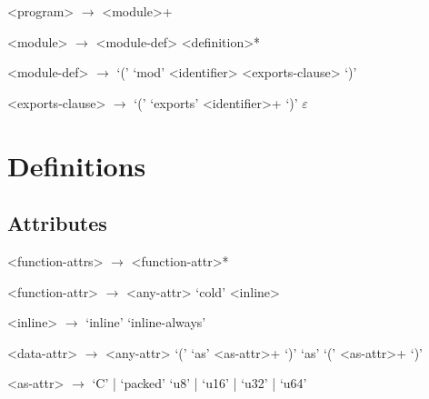 \begin{grammar}
<program> $\to$ <module>+

<module> $\to$ <module-def> <definition>*

<module-def> $\to$ `(' `mod' <identifier> <exports-clause> `)'

<exports-clause> $\to$ `(' `exports' <identifier>+ `)'
                \alt $\varepsilon$


\end{grammar}

\section{Definitions}\label{sec:def}

\subsection{Attributes}\label{sub:attr}
\begin{grammar}
<function-attrs> $\to$ \lit{\#(} <function-attr>* \lit{)}

<function-attr> $\to$ <any-attr>
                 \alt `cold'
                 \alt <inline>

<inline> $\to$ `inline'
          \alt `inline-always'

<data-attr> $\to$ <any-attr>
            \alt `(' `as' <as-attr>+ `)'
            \alt `as' `(' <as-attr>+ `)'

<as-attr> $\to$ `C' | `packed'
          \alt `u8' | `u16' | `u32' | `u64'
\end{grammar}
